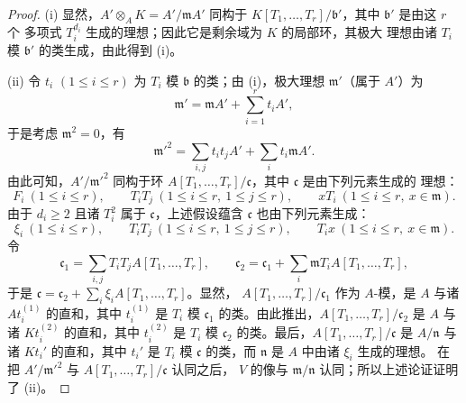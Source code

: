 \begin{proof}
(i) 显然，$A'\otimes_AK=A'/\mathfrak mA'$ 同构于
$K[T_1,\ldots,T_r]/\mathfrak b'$，其中 $\mathfrak b'$ 是由这 $r$ 个
多项式 $T_i^{d_i}$ 生成的理想；因此它是剩余域为 $K$ 的局部环，其极大
理想由诸 $T_i$ 模 $\mathfrak b'$ 的类生成，由此得到 (i)。

(ii) 令 $t_i$ $(1\leqslant i\leqslant r)$ 为 $T_i$ 模
$\mathfrak b$ 的类；由 (i)，极大理想 $\mathfrak m'$（属于 $A'$）为
\[
  \mathfrak m'=\mathfrak mA'+\sum_{i=1}^r t_iA',
\]
于是考虑 $\mathfrak m^2=0$，有
\[
  \mathfrak m'^2=\sum_{i,j}t_it_jA'+\sum_i t_i\mathfrak mA'.
\]
由此可知，$A'/\mathfrak m'^2$ 同构于环
$A[T_1,\ldots,T_r]/\mathfrak c$，其中 $\mathfrak c$ 是由下列元素生成的
理想：
\[
  F_i\ (1\leqslant i\leqslant r),\qquad
  T_iT_j\ (1\leqslant i\leqslant r,\ 1\leqslant j\leqslant r),\qquad
  xT_i\ (1\leqslant i\leqslant r,\ x\in\mathfrak m).
\]
由于 $d_i\geqslant2$ 且诸 $T_i^2$ 属于 $\mathfrak c$，上述假设蕴含
$\mathfrak c$ 也由下列元素生成：
\[
  \xi_i\ (1\leqslant i\leqslant r),\qquad
  T_iT_j\ (1\leqslant i\leqslant r,\ 1\leqslant j\leqslant r),\qquad
  T_ix\ (1\leqslant i\leqslant r,\ x\in\mathfrak m).
\]
令
\[
  \mathfrak c_1=\sum_{i,j}T_iT_jA[T_1,\ldots,T_r],\qquad
  \mathfrak c_2=\mathfrak c_1+\sum_i\mathfrak mT_iA[T_1,\ldots,T_r],
\]
于是 $\mathfrak c=\mathfrak c_2+\sum_i\xi_iA[T_1,\ldots,T_r]$。显然，
$A[T_1,\ldots,T_r]/\mathfrak c_1$ 作为 $A$-模，是 $A$ 与诸
$At_i^{(1)}$ 的直和，其中 $t_i^{(1)}$ 是 $T_i$ 模
$\mathfrak c_1$ 的类。由此推出，$A[T_1,\ldots,T_r]/\mathfrak c_2$
是 $A$ 与诸 $Kt_i^{(2)}$ 的直和，其中 $t_i^{(2)}$ 是 $T_i$ 模
$\mathfrak c_2$ 的类。最后，$A[T_1,\ldots,T_r]/\mathfrak c$ 是
$A/\mathfrak n$ 与诸 $Kt_i'$ 的直和，其中 $t_i'$ 是 $T_i$ 模
$\mathfrak c$ 的类，而 $\mathfrak n$ 是 $A$ 中由诸 $\xi_i$ 生成的理想。
在把 $A'/\mathfrak m'^2$ 与 $A[T_1,\ldots,T_r]/\mathfrak c$ 认同之后，
$V$ 的像与 $\mathfrak m/\mathfrak n$ 认同；所以上述论证证明了 (ii)。
\end{proof}

